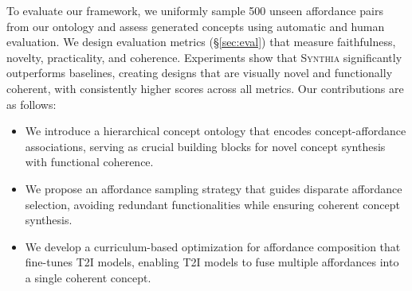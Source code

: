To evaluate our framework, we uniformly sample 500 unseen affordance pairs from our ontology and assess generated concepts using automatic and human evaluation. We design evaluation metrics (\S\ref{sec:eval}) that measure faithfulness, novelty, practicality, and coherence.  
Experiments show that \textsc{Synthia} significantly outperforms baselines, creating designs that are visually novel and functionally coherent, with consistently higher scores across all metrics. Our contributions are as follows:
\vspace{-0.05in}
\begin{itemize}
    \item We introduce a hierarchical concept ontology that encodes concept-affordance associations, serving as crucial building blocks for novel concept synthesis with functional coherence.
    \vspace{-0.05in}
    \item We propose an affordance sampling strategy that guides disparate affordance selection, avoiding redundant functionalities while ensuring coherent concept synthesis.
    \vspace{-0.05in}
    \item We develop a curriculum-based optimization for affordance composition that fine-tunes T2I models, enabling T2I models to fuse multiple affordances into a single coherent concept.
    
\end{itemize}